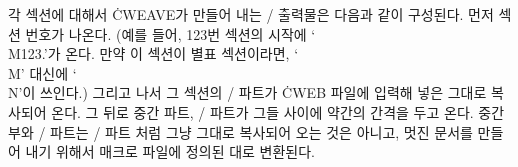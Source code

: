 각 섹션에 대해서 \.{CWEAVE}가 만들어 내는 \TEX/ 출력물은 다음과 같이 구성된다. 먼저 섹션
번호가 나온다. (예를 들어, 123번 섹션의 시작에 `\.{\\M123.}'가 온다. 만약 이 섹션이 별표
섹션이라면, `\.{\\M}' 대신에 `\.{\\N}'이 쓰인다.) 그리고 나서 그 섹션의 \TEX/ 파트가
\.{CWEB} 파일에 입력해 넣은 그대로 복사되어 온다. 그 뒤로 중간 파트, \CEE/ 파트가 그들
사이에 약간의 간격을 두고 온다. 중간부와 \CEE/ 파트는 \TEX/ 파트 처럼 그냥 그대로 복사되어
오는 것은 아니고, 멋진 문서를 만들어 내기 위해서 매크로 파일에 정의된 대로 변환된다.

